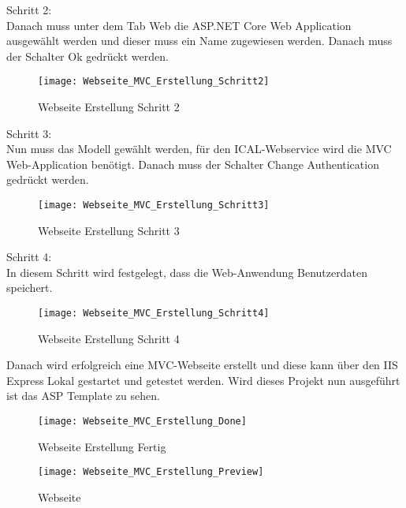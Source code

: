 {Schritt 2:\\
Danach muss unter dem Tab Web die ASP.NET Core Web Application ausgewählt werden und dieser muss ein Name zugewiesen werden. Danach muss der Schalter Ok gedrückt werden.\\
\begin{figure}[H]
    \texttt{[image: Webseite\_MVC\_Erstellung\_Schritt2]}
    \caption{Webseite Erstellung Schritt 2}
    \label{fig:weberstell2}
\end{figure}
Schritt 3:\\
Nun muss das Modell gewählt werden, für den ICAL-Webservice wird die MVC Web-Application benötigt. Danach muss der Schalter Change Authentication gedrückt werden. \\
\begin{figure}[H]
    \texttt{[image: Webseite\_MVC\_Erstellung\_Schritt3]}
    \caption{Webseite Erstellung Schritt 3}
    \label{fig:weberstell3}
\end{figure}Schritt 4:\\
In diesem Schritt wird festgelegt, dass die Web-Anwendung Benutzerdaten speichert.
\begin{figure}[H]
    \texttt{[image: Webseite\_MVC\_Erstellung\_Schritt4]}
    \caption{Webseite Erstellung Schritt 4}
    \label{fig:weberstell4}
\end{figure}
Danach wird erfolgreich eine MVC-Webseite erstellt und diese kann über den IIS Express Lokal gestartet und getestet werden. Wird dieses Projekt nun ausgeführt ist das ASP Template zu sehen.\\
\begin{figure}[H]
    \texttt{[image: Webseite\_MVC\_Erstellung\_Done]}
    \caption{Webseite Erstellung Fertig}
    \label{fig:weberstellfertig}
\end{figure}
\begin{figure}[H]
    \texttt{[image: Webseite\_MVC\_Erstellung\_Preview]}
    \caption{Webseite}
    \label{fig:webseite}
\end{figure}
}
